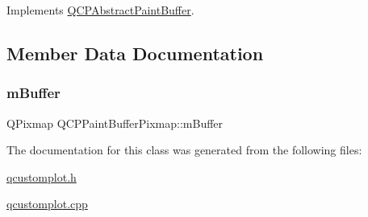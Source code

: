 Implements \hyperlink{class_q_c_p_abstract_paint_buffer_a9e9f29b19c033cf02fb96f1a148463f3}{Q\+C\+P\+Abstract\+Paint\+Buffer}.



\subsection{Member Data Documentation}
\mbox{\label{class_q_c_p_paint_buffer_pixmap_a6d7009f45f03e305f2dc00e52a9225f8}} 
\subsubsection{\texorpdfstring{m\+Buffer}{mBuffer}}
{\footnotesize\ttfamily Q\+Pixmap Q\+C\+P\+Paint\+Buffer\+Pixmap\+::m\+Buffer\hspace{0.3cm}{\ttfamily [protected]}}



The documentation for this class was generated from the following files\+:\begin{DoxyCompactItemize}
\item 
\hyperlink{qcustomplot_8h}{qcustomplot.\+h}\item 
\hyperlink{qcustomplot_8cpp}{qcustomplot.\+cpp}\end{DoxyCompactItemize}
